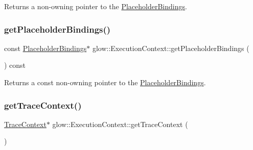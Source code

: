 \begin{DoxyReturn}{Returns}
a non-\/owning pointer to the \hyperlink{classglow_1_1_placeholder_bindings}{Placeholder\+Bindings}. 
\end{DoxyReturn}
\mbox{\label{classglow_1_1_execution_context_a67b9cf8da73f45da3aba2a250164dfb3}} 
\subsubsection{\texorpdfstring{get\+Placeholder\+Bindings()}{getPlaceholderBindings()}\hspace{0.1cm}{\footnotesize\ttfamily [2/2]}}
{\footnotesize\ttfamily const \hyperlink{classglow_1_1_placeholder_bindings}{Placeholder\+Bindings}$\ast$ glow\+::\+Execution\+Context\+::get\+Placeholder\+Bindings (\begin{DoxyParamCaption}{ }\end{DoxyParamCaption}) const\hspace{0.3cm}{\ttfamily [inline]}}

\begin{DoxyReturn}{Returns}
a const non-\/owning pointer to the \hyperlink{classglow_1_1_placeholder_bindings}{Placeholder\+Bindings}. 
\end{DoxyReturn}
\mbox{\label{classglow_1_1_execution_context_a45f5097c2594757a50c7c9579b2d2ed9}} 
\subsubsection{\texorpdfstring{get\+Trace\+Context()}{getTraceContext()}\hspace{0.1cm}{\footnotesize\ttfamily [1/2]}}
{\footnotesize\ttfamily \hyperlink{classglow_1_1_trace_context}{Trace\+Context}$\ast$ glow\+::\+Execution\+Context\+::get\+Trace\+Context (\begin{DoxyParamCaption}{ }\end{DoxyParamCaption})\hspace{0.3cm}{\ttfamily [inline]}}

